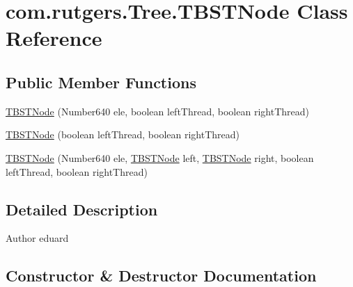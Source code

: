 \hypertarget{classcom_1_1rutgers_1_1Tree_1_1TBSTNode}{}\section{com.\+rutgers.\+Tree.\+T\+B\+S\+T\+Node Class Reference}
\label{classcom_1_1rutgers_1_1Tree_1_1TBSTNode}
\subsection*{Public Member Functions}
\begin{DoxyCompactItemize}
\item 
\hyperlink{classcom_1_1rutgers_1_1Tree_1_1TBSTNode_a1a9f8f31a209a601d997ebc5ffffbed3}{T\+B\+S\+T\+Node} (Number640 ele, boolean left\+Thread, boolean right\+Thread)
\item 
\hyperlink{classcom_1_1rutgers_1_1Tree_1_1TBSTNode_a8596341e0481853d36b1e15b4185b1a3}{T\+B\+S\+T\+Node} (boolean left\+Thread, boolean right\+Thread)
\item 
\hyperlink{classcom_1_1rutgers_1_1Tree_1_1TBSTNode_aea5a9c3059f45036d3f30cd631445455}{T\+B\+S\+T\+Node} (Number640 ele, \hyperlink{classcom_1_1rutgers_1_1Tree_1_1TBSTNode}{T\+B\+S\+T\+Node} left, \hyperlink{classcom_1_1rutgers_1_1Tree_1_1TBSTNode}{T\+B\+S\+T\+Node} right, boolean left\+Thread, boolean right\+Thread)
\end{DoxyCompactItemize}


\subsection{Detailed Description}
\begin{DoxyAuthor}{Author}
eduard 
\end{DoxyAuthor}


\subsection{Constructor \& Destructor Documentation}
\mbox{\label{classcom_1_1rutgers_1_1Tree_1_1TBSTNode_a1a9f8f31a209a601d997ebc5ffffbed3}} 
